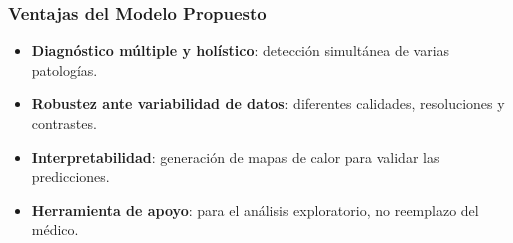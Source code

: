 \begin{frame}
\frametitle{Ventajas del Modelo Propuesto}
\begin{itemize}
    \item \textbf{Diagnóstico múltiple y holístico}: detección simultánea de varias patologías.
    \item \textbf{Robustez ante variabilidad de datos}: diferentes calidades, resoluciones y contrastes.
    \item \textbf{Interpretabilidad}: generación de mapas de calor para validar las predicciones.
    \item \textbf{Herramienta de apoyo}: para el análisis exploratorio, no reemplazo del médico.
\end{itemize}
\end{frame}

